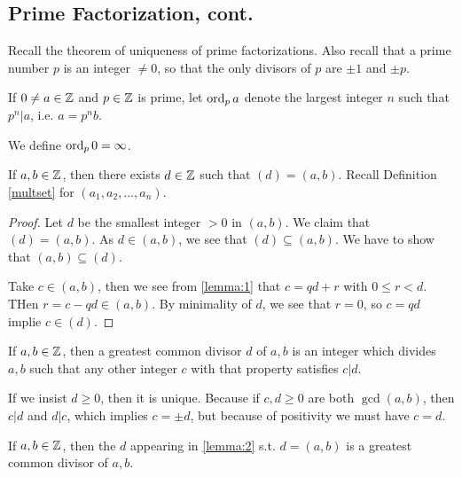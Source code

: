 \documentclass{article}
\begin{document}
\subsection{Prime Factorization, cont.}
Recall the theorem of uniqueness of prime factorizations. Also recall that a prime number $p$ is an integer $\neq 0$, so that the only divisors of $p$ are $\pm 1$ and $\pm p$.

\begin{definition}
    If $0 \neq a \in \mathbb Z$ and $p \in \mathbb Z$ is prime, let $\operatorname{ord}_p a$ denote the largest integer $n$ such that $p^n \vert a$, i.e. $a = p^n b$.

    We define $\operatorname{ord}_p 0 = \infty$.
\end{definition}

\begin{lemma}
    \label{lemma:2}
    If $a, b \in \mathbb Z$, then there exists $d \in \mathbb Z$ such that $(d) = (a, b)$. Recall Definition \ref{multset} for $(a_1, a_2, \ldots, a_n)$.
\end{lemma}


\begin{proof}
    Let $d$ be the smallest integer $> 0$ in $(a, b)$. We claim that $(d) = (a, b)$. As $d \in (a, b)$, we see that $(d) \subseteq (a, b)$. We have to show that $(a, b) \subseteq (d)$.

    Take $c \in (a, b)$, then we see from  \ref{lemma:1} that $c = qd + r$ with $0 \leq r < d$. THen $r = c-qd \in (a,b)$. By minimality of $d$, we see that $r = 0$, so $c = qd$ implie $c \in (d)$.
\end{proof}

\begin{definition}
    If $a, b \in \mathbb Z$, then a greatest common divisor $d$ of $a, b$ is an integer which divides $a, b$ such that any other integer $c$ with that property satisfies $c | d$.
\end{definition}

\begin{remark}
    If we insist $d \geq 0$, then it is unique. Because if $c, d \geq 0$ are both $\gcd(a, b)$, then $c | d$ and $d | c$, which implies $c = \pm d$, but because of positivity we must have $c = d$.
\end{remark}

\begin{proposition}
    If $a, b \in \mathbb Z$, then the $d$ appearing in \ref{lemma:2} s.t. $d = (a, b)$ is a greatest common divisor of $a, b$.
\end{proposition}
\end{document}
